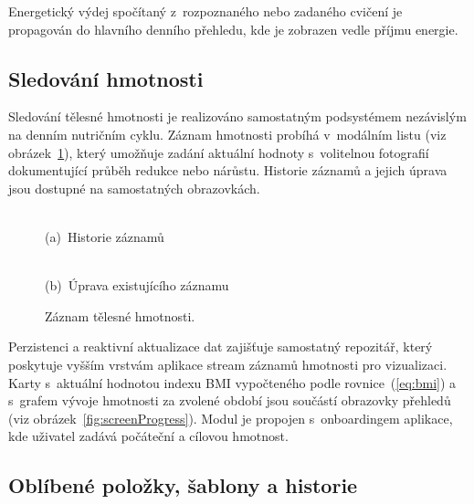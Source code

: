 Energetický výdej spočítaný z~rozpoznaného nebo zadaného cvičení je propagován do hlavního denního přehledu, kde je zobrazen vedle příjmu energie.

\subsection{Sledování hmotnosti}
\label{subsec:sledovaniHmotnosti}

Sledování tělesné hmotnosti je realizováno samostatným podsystémem nezávislým na denním nutričním cyklu.
Záznam hmotnosti probíhá v~modálním listu (viz obrázek~\ref{fig:screenWeightSheet}), který umožňuje zadání aktuální hodnoty s~volitelnou fotografií dokumentující průběh redukce nebo nárůstu.
Historie záznamů a jejich úprava jsou dostupné na samostatných obrazovkách.

\begin{figure}[!htb]
	\centering
	\begin{minipage}[t]{0.31\textwidth}
		\centering
		\\(a)~Historie záznamů
	\end{minipage}\hspace{3em}
	\begin{minipage}[t]{0.31\textwidth}
		\centering
		\\(b)~Úprava existujícího záznamu
	\end{minipage}
	\caption{Záznam tělesné hmotnosti.}
	\label{fig:screenWeightSheet}
\end{figure}

Perzistenci a reaktivní aktualizace dat zajišťuje samostatný repozitář, který poskytuje vyšším vrstvám aplikace stream záznamů hmotnosti pro vizualizaci.
Karty s~aktuální hodnotou indexu BMI vypočteného podle rovnice~(\ref{eq:bmi}) a s~grafem vývoje hmotnosti za zvolené období jsou součástí obrazovky přehledů (viz obrázek~\ref{fig:screenProgress}).
Modul je propojen s~onboardingem aplikace, kde uživatel zadává počáteční a cílovou hmotnost.

\subsection{Oblíbené položky, šablony a historie}
\label{subsec:oblibene}


